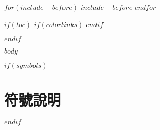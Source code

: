 \documentclass[$if(fontsize)$$fontsize$,$endif$$if(lang)$$babel-lang$,$endif$$if(papersize)$$papersize$paper,$endif$$for(classoption)$$classoption$$sep$,$endfor$]{$documentclass$}
\def\LARGE{\fontsize{20}{30}\selectfont}  %
\begin{document}
$for(include-before)$
$include-before$
$endfor$

$if(toc)$
\begingroup
    \makeatletter
    \def\@makeschapterhead#1{%
      \vspace*{-16mm}
      {\parindent \z@ \raggedright
        \normalfont
        \interlinepenalty\@M
        \LARGE\bfseries\centering #1\par\nobreak
        \vskip 12\p@
      }}
    \makeatother
    \renewcommand{\contentsname}{\center 目錄 \addcontentsline{toc}{chapter}{目錄}}
    \renewcommand{\numberline}[1]{~#1\hspace*{1em}}
    $if(colorlinks)$
    \hypersetup{linkcolor=$if(toccolor)$$toccolor$$else$black$endif$}
    $endif$
    \setcounter{tocdepth}{$toc-depth$}
    \tableofcontents
    \newcommand{\lotlabel}{表}
    \renewcommand{\listtablename}{\center 表目錄 \addcontentsline{toc}{chapter}{表目錄}}
    \renewcommand{\numberline}[1]{\lotlabel~#1\hspace*{1em}}
    \listoftables
    \newcommand{\loflabel}{圖}
    \renewcommand{\listfigurename}{\center 圖目錄 \addcontentsline{toc}{chapter}{圖目錄}}
    \renewcommand{\numberline}[1]{\loflabel~#1\hspace*{1em}}
    \listoffigures
\endgroup
$endif$

\mainmatter
$body$

$if(symbols)$
\chapter*{符號說明}
\fontsize{14}{21}\selectfont{$symbols$}
$endif$
\end{document}

